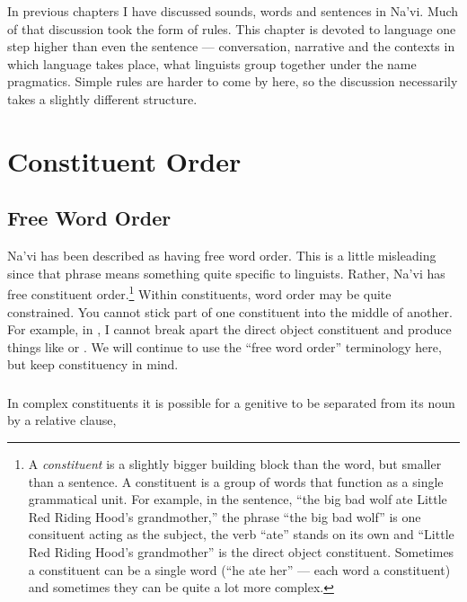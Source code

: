 
\noindent In previous chapters I have discussed sounds, words and
sentences in Na'vi.  Much of that discus\-sion took the form of rules.
This chapter is devoted to language one step higher than even the
sentence --- conversation, narrative and the contexts in which
language takes place, what linguists group together under the name
pragmatics.  Simple rules are harder to come by here, so the
discussion necessarily takes a slightly different structure.


\section{Constituent Order}

\subsection{Free Word Order} Na'vi has been described as having free
word order.  This is a little misleading since that phrase means
something quite specific to linguists.  Rather, Na'vi has free
constituent order.\footnote{A \textit{constituent} is a slightly
bigger building block than the word, but smaller than a sentence.  A
constituent is a group of words that function as a single
grammatical unit.  For example, in the sentence, ``the big bad wolf
ate Little Red Riding Hood's grandmother,'' the phrase ``the big bad
wolf'' is one consituent acting as the subject, the verb ``ate''
stands on its own and ``Little Red Riding Hood's grandmother'' is
the direct object constituent.  Sometimes a constituent can be a
single word (``he ate her'' --- each word a constituent) and
sometimes they can be quite a lot more complex.}  Within
constituents, word order may be quite constrained.  You cannot stick
part of one constituent into the middle of another.  For example, in
 ,
I cannot break apart the direct object constituent 
and produce things like  or .  We will continue to use the ``free word
order'' terminology here, but keep constituency in mind.

\subsubsection{} In complex constituents it is possible for a genitive
to be separated from its noun by a relative clause,

